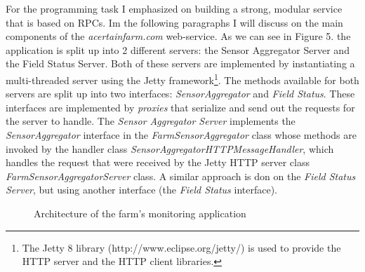 \documentclass{article}      %
\begin{document}
For the programming task I emphasized on building a strong, modular service that is based on RPCs. Im the following paragraphs I will discuss on the main components of the \emph{acertainfarm.com} web-service. As we can see in Figure 5. the application is split up into 2 different servers: the Sensor Aggregator Server and the Field Status Server. Both of these servers are implemented by instantiating a multi-threaded server using the Jetty framework\footnote{The Jetty 8 library (http://www.eclipse.org/jetty/) is used to provide the HTTP server and the HTTP client libraries.}.  The methods available for both servers are split up into two interfaces: \emph{SensorAggregator} and \emph{Field Status}. These interfaces are implemented by \emph{proxies} that serialize and send out the requests for the server to handle. The \emph{Sensor Aggregator Server} implements the \emph{SensorAggregator} interface in the \emph{FarmSensorAggregator} class whose methods are invoked by the handler class \emph{SensorAggregatorHTTPMessageHandler}, which handles the request that were received by the Jetty HTTP server class \emph{FarmSensorAggregatorServer} class. A similar approach is don on the \emph{Field Status Server}, but using another interface (the \emph{Field Status} interface). \\

\begin{figure}[ht]
\centering

{%
\setlength{\fboxsep}{5pt}%
%
}%
\caption{Architecture of the farm's monitoring application \label{overflow}}
\end{figure}
\end{document}
